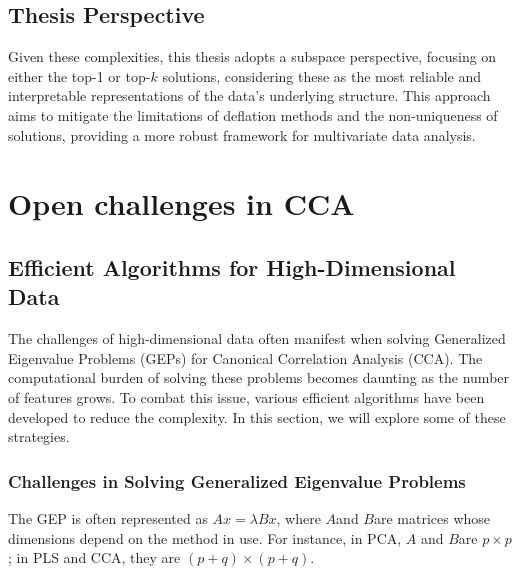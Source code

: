 \subsection{Thesis Perspective}

Given these complexities, this thesis adopts a subspace perspective, focusing on either the top-1 or top-$k$ solutions, considering these as the most reliable and interpretable representations of the data's underlying structure.
This approach aims to mitigate the limitations of deflation methods and the non-uniqueness of solutions, providing a more robust framework for multivariate data analysis.

\section{Open challenges in CCA}

\subsection{Efficient Algorithms for High-Dimensional Data}

The challenges of high-dimensional data often manifest when solving Generalized Eigenvalue Problems (GEPs) for Canonical Correlation Analysis (CCA). The computational burden of solving these problems becomes daunting as the number of features grows. To combat this issue, various efficient algorithms have been developed to reduce the complexity. In this section, we will explore some of these strategies.

\subsubsection{Challenges in Solving Generalized Eigenvalue Problems}

The GEP is often represented as \( Ax = \lambda Bx \), where \( A \)and \( B \)are matrices whose dimensions depend on the method in use.
For instance, in PCA, \( A \) and \( B \)are \( p \times p \); in PLS and CCA, they are \( (p+q) \times (p+q) \).

